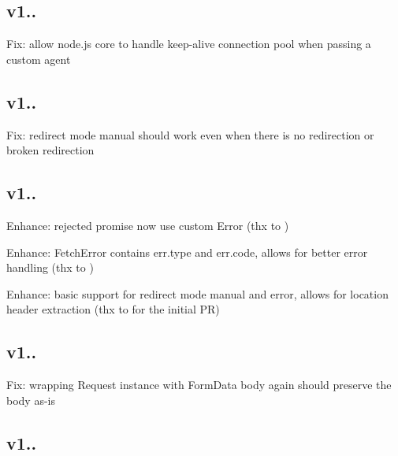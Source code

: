 \subsection*{v1..}


\begin{DoxyItemize}
\item Fix\+: allow node.\+js core to handle keep-\/alive connection pool when passing a custom agent
\end{DoxyItemize}

\subsection*{v1..}


\begin{DoxyItemize}
\item Fix\+: redirect mode {\ttfamily manual} should work even when there is no redirection or broken redirection
\end{DoxyItemize}

\subsection*{v1..}


\begin{DoxyItemize}
\item Enhance\+: rejected promise now use custom {\ttfamily Error} (thx to )
\item Enhance\+: {\ttfamily Fetch\+Error} contains {\ttfamily err.\+type} and {\ttfamily err.\+code}, allows for better error handling (thx to )
\item Enhance\+: basic support for redirect mode {\ttfamily manual} and {\ttfamily error}, allows for location header extraction (thx to  for the initial PR)
\end{DoxyItemize}

\subsection*{v1..}


\begin{DoxyItemize}
\item Fix\+: wrapping Request instance with Form\+Data body again should preserve the body as-\/is
\end{DoxyItemize}

\subsection*{v1..}


